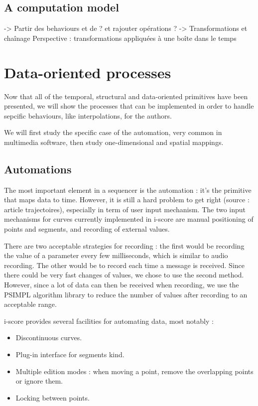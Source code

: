 \documentclass{sigchi}
\begin{document}
\subsection{A computation model}

-> Partir des behaviours et de ? et rajouter opérations ?
-> Transformations et chaînage
Perspective : transformations appliquées à une boîte dans le temps


\section{Data-oriented processes}
Now that all of the temporal, structural and data-oriented primitives have been presented, we will show the processes that can be implemented in order to handle sepcific behaviours, like interpolations, for the authors.

We will first study the specific case of the automation, very common in multimedia software, then study one-dimensional and spatial mappings.
\subsection{Automations}
The most important element in a sequencer is the automation : it's the primitive that maps data to time. However, it is still a hard problem to get right (source : article trajectoires), especially in term of user input mechanism. The two input mechanisms for curves currently implemented in i-score are manual positioning of points and segments, and recording of external values. 

There are two acceptable strategies for recording : the first would be recording the value of a parameter every few milliseconds, which is similar to audio recording. The other would be to record each time a message is received. Since there could be very fast changes of values, we chose to use the second method.
However, since a lot of data can then be received when recording, we use the PSIMPL\cite{psimpl} algorithm library to reduce the number of values after recording to an acceptable range.

i-score provides several facilities for automating data, most notably : 
\begin{itemize}
    \item Discontinuous curves.
    \item Plug-in interface for segments kind.
    \item Multiple edition modes : when moving a point, remove the overlapping points or ignore them.
    \item Locking between points.
\end{itemize}
\end{document}
